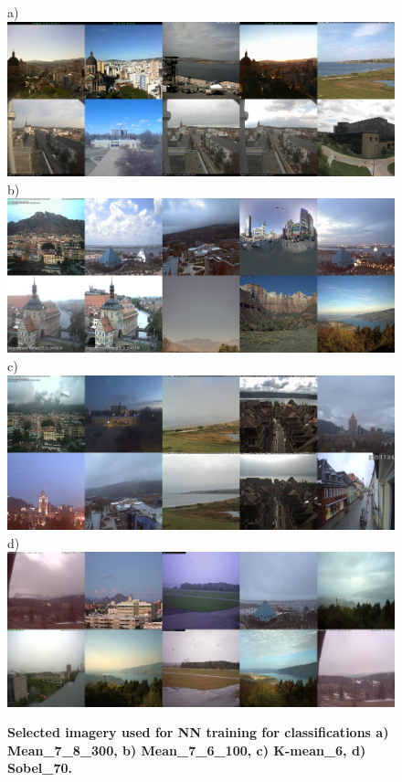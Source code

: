 \documentclass[final,3p,times,authoryear]{elsarticle}
\begin{document}
\begin{figure}
\centering
a)\includegraphics[trim = 0mm 0mm 0mm 0mm,clip,scale=0.12]{Images/13-0_Mean_7_8_300_tiles.png}
b)\includegraphics[trim = 0mm 0mm 0mm 0mm,clip,scale=0.12]{Images/13-3_Mean_7_6_100_tiles.png}
c)\includegraphics[trim = 0mm 0mm 0mm 0mm,clip,scale=0.12]{Images/13-5_K-mean_6_tiles.png}
d)\includegraphics[trim = 0mm 0mm 0mm 0mm,clip,scale=0.12]{Images/13-9_Sobel_70_tiles.png}
\caption{\textbf{Selected imagery used for NN training for classifications 
a) Mean\_7\_8\_300, b) Mean\_7\_6\_100, c) K-mean\_6, d) Sobel\_70.}}
\label{fig:classImages}
\end{figure}
\end{document}
